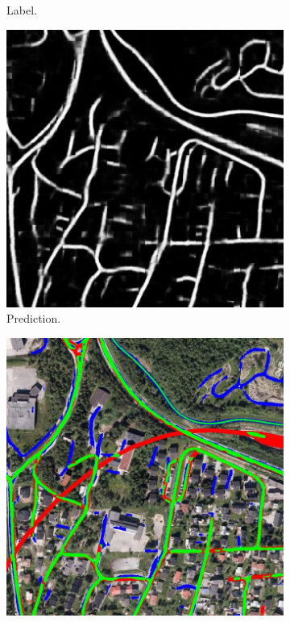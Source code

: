 \begin{figure}[H]
\begin{subfigure}{0.23\textwidth}
\caption{Label.}
\vspace{0.1cm} %
\end{subfigure}
\hspace*{\fill} %
\begin{subfigure}{0.23\textwidth}
\includegraphics[width=\textwidth]{figs/appendix/pred1217.jpg}
\caption{Prediction.}
\vspace{0.1cm} %
\end{subfigure}
\hspace*{\fill} %
\begin{subfigure}{0.23\textwidth}
\includegraphics[width=\textwidth]{figs/appendix/hit1217.jpg}

\end{subfigure}
\end{figure}
